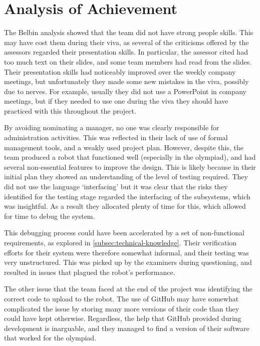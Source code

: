 

\section{Analysis of Achievement}\label{sec:achievement}
    The Belbin analysis showed that the team did not have strong people skills.
    This may have cost them during their viva, as several of the criticisms offered by the assessors regarded their presentation skills.
    In particular, the assessor cited had too much text on their slides, and some team members had read from the slides.
    Their presentation skills had noticeably improved over the weekly company meetings, but unfortunately they made some new mistakes in the viva, possibly due to nerves.
    For example, usually they did not use a PowerPoint in company meetings, but if they needed to use one during the viva they should have practiced with this throughout the project.

    By avoiding nominating a manager, no one was clearly responsible for administration activities.
    This was reflected in their lack of use of formal management tools, and a weakly used project plan.
    However, despite this, the team produced a robot that functioned well (especially in the olympiad), and had several non-essential features to improve the design.
    This is likely because in their initial plan they showed an understanding of the level of testing required.
    They did not use the language `interfacing' but it was clear that the risks they identified for the testing stage regarded the interfacing of the subsystems, which was insightful.
    As a result they allocated plenty of time for this, which allowed for time to debug the system.

    This debugging process could have been accelerated by a set of non-functional requirements, as explored in \autoref{subsec:technical-knowledge}.
    Their verification efforts for their system were therefore somewhat informal, and their testing was very unstructured.
    This was picked up by the examiners during questioning, and resulted in issues that plagued the robot's performance.

    The other issue that the team faced at the end of the project was identifying the correct code to upload to the robot.
    The use of GitHub may have somewhat complicated the issue by storing many more versions of their code than they could have kept otherwise.
    Regardless, the help that GitHub provided during development is inarguable, and they managed to find a version of their software that worked for the olympiad.

